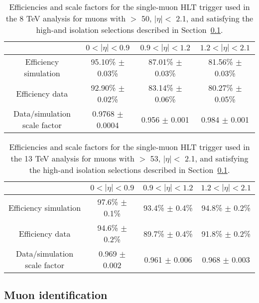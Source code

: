 \begin{table}[!htb]
\centering
\caption{Efficiencies and scale factors for the single-muon HLT trigger used in the 8 TeV analysis
for muons with \pt $>$ 50\GeV, $|\eta| <$ 2.1, and satisfying the high-\pt and isolation selections described in Section~\ref{subsec:muonid}.}
\begin{tabular}{ c | c | c | c}
 & $0 < |\eta| < 0.9$ & $0.9 < |\eta| < 1.2$ & $1.2 < |\eta| < 2.1$\\
\hline
\hline
Efficiency simulation & 95.10\% $\pm$ 0.03\% & 87.01\% $\pm$ 0.03\% & 81.56\% $\pm$ 0.03\%\\
Efficiency data & 92.90\% $\pm$ 0.02\% & 83.14\% $\pm$ 0.06\% & 80.27\% $\pm$ 0.05\%\\
Data/simulation scale factor & 0.9768 $\pm$ 0.0004 & 0.956 $\pm$ 0.001 & 0.984 $\pm$ 0.001\\
\hline 
\end{tabular}
\label{tab:hltMueff8TeV}
\end{table}

\begin{table}[!htb]
\centering
\caption{Efficiencies and scale factors for the single-muon HLT trigger used in the 13 TeV analysis
for muons with \pt $>$ 53\GeV, $|\eta| <$ 2.1, and satisfying the high-\pt and isolation selections described in Section~\ref{subsec:muonid}.}
\begin{tabular}{ c | c | c | c}
 & $0 < |\eta| < 0.9$ & $0.9 < |\eta| < 1.2$ & $1.2 < |\eta| < 2.1$\\
\hline
\hline
Efficiency simulation & 97.6\% $\pm$ 0.1\% & 93.4\% $\pm$ 0.4\% & 94.8\% $\pm$ 0.2\%\\
Efficiency data & 94.6\% $\pm$ 0.2\% & 89.7\% $\pm$ 0.4\% & 91.8\% $\pm$ 0.2\%\\
Data/simulation scale factor & 0.969 $\pm$ 0.002 & 0.961 $\pm$ 0.006 & 0.968 $\pm$ 0.003\\
\hline 
\end{tabular}
\label{tab:hltMueff13TeV}
\end{table}

\subsection{Muon identification}\label{subsec:muonid}

